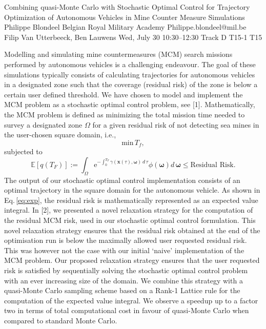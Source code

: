 \begin{talk}
  {Combining quasi-Monte Carlo with Stochastic Optimal Control for Trajectory Optimization of Autonomous Vehicles in Mine Counter Measure Simulations}%
  {Philippe Blondeel}%
  {Belgian Royal Military Academy}%
  {Philippe.blondeel@mil.be}%
  {Filip Van Utterbeeck, Ben Lauwens}%
  {}%
  {Wed, July 30 10:30–12:30 Track D}%
  {T15-1}%
  {T15}%
			
Modelling and simulating mine countermeasures (MCM) search missions performed by autonomous vehicles is a challenging endeavour. The goal of these simulations typically consists of calculating trajectories for autonomous vehicles in a designated zone such that the coverage (residual risk) of the zone is below a certain user defined threshold. We have chosen to model and implement the MCM problem as a stochastic optimal control problem, see [1]. Mathematically, the MCM problem is defined as minimizing the total mission time needed to survey a designated zone $\Omega$ for a given residual risk of not detecting sea mines in the  user-chosen square  domain, i.e., 
\begin{equation}
\text{min}\, T_f,
\label{eq:min}
\end{equation}
subjected to
\begin{equation}
 \mathbb{E}[q\left(T_F\right)] :=  \int_\Omega \text{e}^{-\int_0^{T_F} \gamma\left(\bm{x}\left(\tau\right),\bm{\omega}\right)\, d\,\tau}\phi\left(\bm{\omega}\right) d\,\bm{\omega} \leq \text{Residual Risk}.
\label{eq:exp}
\end{equation}
The output of our stochastic optimal control implementation consists of an optimal trajectory in the square domain for the autonomous vehicle.  As shown in Eq.\,\eqref{eq:exp}, the residual risk is mathematically represented as an expected value integral. In [2], we presented a novel relaxation strategy for the computation of the residual MCM risk, used in our stochastic optimal control formulation. This novel relaxation strategy ensures that the  residual risk obtained at the end of the optimisation run is below the maximally allowed user requested residual risk. This was however not the case  with our initial `naive' implementation of the MCM problem. Our proposed relaxation strategy ensures that the user requested risk is satisfied by sequentially solving the stochastic optimal control problem with an ever increasing size of the domain. We combine this strategy with  a quasi-Monte Carlo  sampling scheme based on a Rank-1 Lattice rule for the computation of the expected value integral. We observe a speedup up to a factor two in terms of total computational cost in favour of quasi-Monte Carlo when compared to standard Monte Carlo.



\end{talk}
